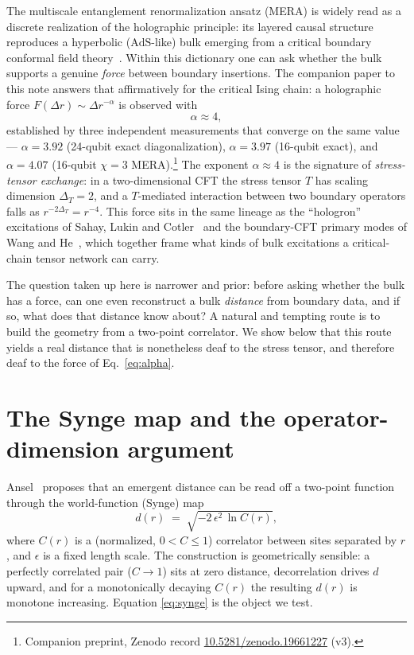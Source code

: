 \documentclass[11pt]{article}
\begin{document}
The multiscale entanglement renormalization ansatz (MERA) is widely read as a discrete
realization of the holographic principle: its layered causal structure reproduces a
hyperbolic ($\mathrm{AdS}$-like) bulk emerging from a critical boundary conformal field
theory~\cite{Swingle2012,EvenblyVidal2011}. Within this dictionary one can ask whether
the bulk supports a genuine \emph{force} between boundary insertions. The companion paper
to this note answers that affirmatively for the critical Ising chain: a holographic force
$F(\Delta r)\sim\Delta r^{-\alpha}$ is observed with
\begin{equation}
  \alpha\approx4,
  \label{eq:alpha}
\end{equation}
established by three independent measurements that converge on the same value ---
$\alpha=3.92$ (24-qubit exact diagonalization), $\alpha=3.97$ (16-qubit exact), and
$\alpha=4.07$ (16-qubit $\chi=3$ MERA).\footnote{Companion preprint, Zenodo record
\href{https://doi.org/10.5281/zenodo.19661227}{10.5281/zenodo.19661227} (v3).} The exponent
$\alpha\approx4$ is the signature of \emph{stress-tensor exchange}: in a two-dimensional
CFT the stress tensor $T$ has scaling dimension $\Delta_T=2$, and a $T$-mediated
interaction between two boundary operators falls as $r^{-2\Delta_T}=r^{-4}$. This force sits
in the same lineage as the ``hologron'' excitations of
Sahay, Lukin and Cotler~\cite{SahayLukinCotler2024} and the boundary-CFT primary modes of
Wang and He~\cite{WangHe2025}, which together frame what kinds of bulk excitations a
critical-chain tensor network can carry.

The question taken up here is narrower and prior: before asking whether the bulk has a
force, can one even reconstruct a bulk \emph{distance} from boundary data, and if so, what
does that distance know about? A natural and tempting route is to build the geometry from a
two-point correlator. We show below that this route yields a real distance that is
nonetheless deaf to the stress tensor, and therefore deaf to the force of
Eq.~\eqref{eq:alpha}.

\section{The Synge map and the operator-dimension argument}
\label{sec:synge}

Ansel~\cite{Ansel2024} proposes that an emergent distance can be read off a two-point
function through the world-function (Synge) map
\begin{equation}
  d(r) \;=\; \sqrt{-2\,\epsilon^{2}\,\ln C(r)},
  \label{eq:synge}
\end{equation}
where $C(r)$ is a (normalized, $0<C\le1$) correlator between sites separated by $r$, and
$\epsilon$ is a fixed length scale. The construction is geometrically sensible: a perfectly
correlated pair ($C\to1$) sits at zero distance, decorrelation drives $d$ upward, and for a
monotonically decaying $C(r)$ the resulting $d(r)$ is monotone increasing. Equation
\eqref{eq:synge} is the object we test.
\end{document}
